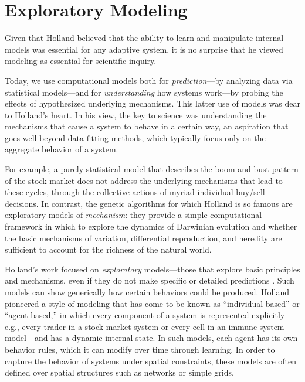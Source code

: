 \documentclass{sig-alternate}
\begin{document}

\section{Exploratory Modeling}

Given that Holland believed that the ability to learn and manipulate
internal models was essential for any adaptive system, it is no
surprise that he viewed modeling as essential for scientific inquiry.


Today, we use computational models both for \emph{prediction}---by
analyzing data via statistical models---and for \emph{understanding}
how systems work---by probing the effects of hypothesized underlying
mechanisms.  This latter use of models was dear to Holland's heart.
In his view, the key to science was understanding the mechanisms that
cause a system to behave in a certain way, an aspiration that goes
well beyond data-fitting methods, which typically focus only on
the aggregate behavior of a system.  

For example, a purely statistical model that describes the boom and bust
pattern of the stock market
does not address the underlying mechanisms
that lead to these cycles, through the collective actions of myriad
individual buy/sell decisions.  
In contrast, the genetic algorithms for which Holland is so famous
are exploratory models of \emph{mechanism}: they provide a simple
computational framework in which to explore the dynamics of Darwinian
evolution and whether the basic mechanisms of variation, differential
reproduction, and heredity are sufficient to account for the richness
of the natural world.

Holland's work focused on \emph{exploratory} models---those that explore basic principles and
mechanisms, even if they do not make specific or detailed
predictions \cite{Holland1995}.  Such models can show generically how certain behaviors
could be produced.  Holland pioneered a style of modeling that has
come to be known as ``individual-based'' or ``agent-based,'' in which
every component of a system is represented explicitly---e.g., every
trader in a stock market system or every cell in an immune system
model---and has a dynamic internal state. In such models, each agent has
its own behavior rules, which it can modify over time through learning.  In
order to capture the behavior of systems under spatial
constraints, these models are often defined over spatial structures
such as networks or simple grids.
\end{document}
